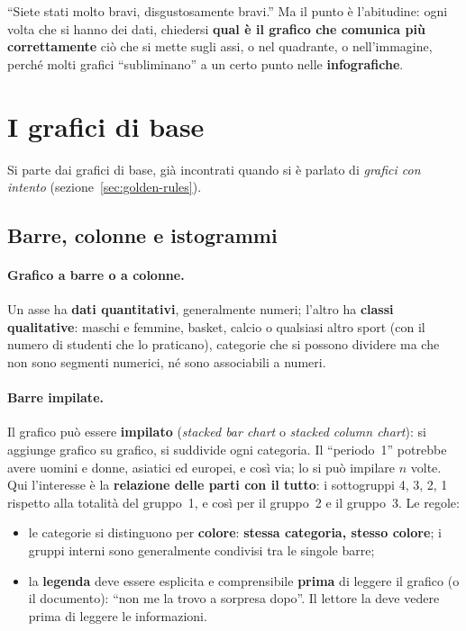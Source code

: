 ``Siete stati molto bravi, disgustosamente bravi.'' Ma il punto è
l'abitudine: ogni volta che si hanno dei dati, chiedersi \textbf{qual è il
grafico che comunica più correttamente} ciò che si mette sugli assi, o nel
quadrante, o nell'immagine, perché molti grafici ``subliminano'' a un certo
punto nelle \textbf{infografiche}.

\section{I grafici di base}
\label{sec:grafici-base}

Si parte dai grafici di base, già incontrati quando si è parlato di
\emph{grafici con intento} (sezione~\ref{sec:golden-rules}).

\subsection{Barre, colonne e istogrammi}

\paragraph{Grafico a barre o a colonne.} Un asse ha \textbf{dati
quantitativi}, generalmente numeri; l'altro ha \textbf{classi
qualitative}: maschi e femmine, basket, calcio o qualsiasi altro sport (con il
numero di studenti che lo praticano), categorie che si possono dividere ma
che non sono segmenti numerici, né sono associabili a numeri.

\paragraph{Barre impilate.} Il grafico può essere \textbf{impilato}
(\emph{stacked bar chart} o \emph{stacked column chart}): si aggiunge grafico
su grafico, si suddivide ogni categoria. Il ``periodo~1'' potrebbe avere
uomini e donne, asiatici ed europei, e così via; lo si può impilare $n$ volte.
Qui l'interesse è la \textbf{relazione delle parti con il tutto}: i
sottogruppi 4, 3, 2, 1 rispetto alla totalità del gruppo~1, e così per il
gruppo~2 e il gruppo~3. Le regole:
\begin{itemize}
  \item le categorie si distinguono per \textbf{colore}: \textbf{stessa
        categoria, stesso colore}; i gruppi interni sono generalmente
        condivisi tra le singole barre;
  \item la \textbf{legenda} deve essere esplicita e comprensibile
        \textbf{prima} di leggere il grafico (o il documento): ``non me la
        trovo a sorpresa dopo''. Il lettore la deve vedere prima di leggere
        le informazioni.
\end{itemize}

